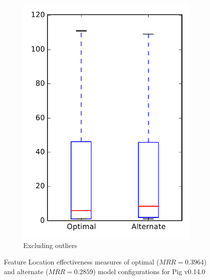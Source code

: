 \begin{figure}
\begin{subfigure}{.4\textwidth}
        \includegraphics[height=0.4\textheight]{figures/combo/flt_rq1_pig_no_outlier}
        \caption{Excluding outliers}\label{fig:combo:flt:rq1:pig_no_outlier}
    \end{subfigure}
\caption[Feature Location effectiveness measures of optimal and alternate model configurations for Pig v0.14.0]%
{Feature Location effectiveness measures of optimal ($MRR=0.3964$) and alternate ($MRR=0.2859$) model configurations for Pig v0.14.0}
\label{fig:combo:flt:rq1:pig}
\end{figure}
